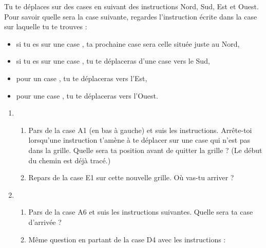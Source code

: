 \documentclass[class=report,crop=false, 12pt]{standalone}
\begin{document}
\begin{activite}

Tu te déplaces sur des cases en suivant des instructions Nord, Sud, Est et Ouest.
Pour savoir quelle sera la case suivante, regardes l'instruction écrite dans la case sur laquelle tu te trouves :
\begin{itemize}
  \item si tu es sur une case , ta prochaine case sera celle située juste au Nord, %
  \item si tu es sur une case , tu te déplaceras d'une case vers le Sud,
  \item pour un case , tu te déplaceras vers l'Est,
  \item pour une case , tu te déplaceras vers l'Ouest.
\end{itemize}

\medskip

\begin{enumerate}
  \item
  \begin{enumerate}
    \item  Pars de la case A1 (en bas à gauche) et suis les instructions. Arrête-toi lorsqu'une instruction t'amène à te déplacer sur une case qui n'est pas dans la grille. Quelle sera ta position avant de quitter la grille ? (Le début du chemin est déjà tracé.)
\medskip    
    
    
    \item Repars de la case E1 sur cette nouvelle grille. Où vas-tu arriver ?  
\medskip    
      
     
  \end{enumerate} 
   
  \item
  \begin{enumerate}
    \item Pars de la case A6 et suis les instructions suivantes. Quelle sera ta case d'arrivée ?
    
    \centerline{}
\medskip    
    
      
    \item Même question en partant de la case D4 avec les instructions : 
    

\end{enumerate}
\end{enumerate}
\end{activite}
\end{document}
